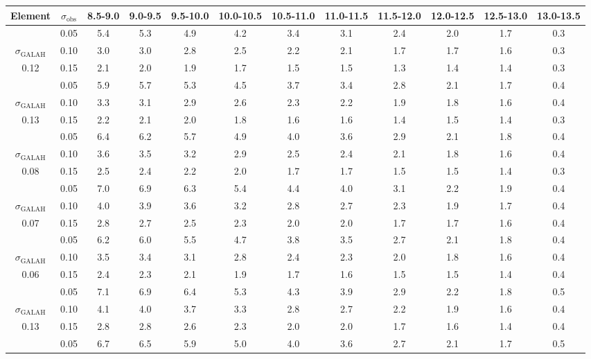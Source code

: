 \begin{tabular}{cccccccccccc}
\hline\hline
Element & $\sigma_\mathrm{obs}$  & 8.5-9.0 & 9.0-9.5 & 9.5-10.0 & 10.0-10.5 & 10.5-11.0 & 11.0-11.5 & 11.5-12.0 & 12.0-12.5 & 12.5-13.0 & 13.0-13.5 \\
\hline
[C/H] & 0.05 & 5.4 & 5.3 & 4.9 & 4.2 & 3.4 & 3.1 & 2.4 & 2.0 & 1.7 & 0.3 \\
$\sigma_\mathrm{GALAH}$ & 0.10 & 3.0 & 3.0 & 2.8 & 2.5 & 2.2 & 2.1 & 1.7 & 1.7 & 1.6 & 0.3 \\
0.12 & 0.15 & 2.1 & 2.0 & 1.9 & 1.7 & 1.5 & 1.5 & 1.3 & 1.4 & 1.4 & 0.3 \\
\hline
[O/H] & 0.05 & 5.9 & 5.7 & 5.3 & 4.5 & 3.7 & 3.4 & 2.8 & 2.1 & 1.7 & 0.4 \\
$\sigma_\mathrm{GALAH}$ & 0.10 & 3.3 & 3.1 & 2.9 & 2.6 & 2.3 & 2.2 & 1.9 & 1.8 & 1.6 & 0.4 \\
0.13 & 0.15 & 2.2 & 2.1 & 2.0 & 1.8 & 1.6 & 1.6 & 1.4 & 1.5 & 1.4 & 0.3 \\
\hline
[Mg/H] & 0.05 & 6.4 & 6.2 & 5.7 & 4.9 & 4.0 & 3.6 & 2.9 & 2.1 & 1.8 & 0.4 \\
$\sigma_\mathrm{GALAH}$ & 0.10 & 3.6 & 3.5 & 3.2 & 2.9 & 2.5 & 2.4 & 2.1 & 1.8 & 1.6 & 0.4 \\
0.08 & 0.15 & 2.5 & 2.4 & 2.2 & 2.0 & 1.7 & 1.7 & 1.5 & 1.5 & 1.4 & 0.3 \\
\hline
[Al/H] & 0.05 & 7.0 & 6.9 & 6.3 & 5.4 & 4.4 & 4.0 & 3.1 & 2.2 & 1.9 & 0.4 \\
$\sigma_\mathrm{GALAH}$ & 0.10 & 4.0 & 3.9 & 3.6 & 3.2 & 2.8 & 2.7 & 2.3 & 1.9 & 1.7 & 0.4 \\
0.07 & 0.15 & 2.8 & 2.7 & 2.5 & 2.3 & 2.0 & 2.0 & 1.7 & 1.7 & 1.6 & 0.4 \\
\hline
[Si/H] & 0.05 & 6.2 & 6.0 & 5.5 & 4.7 & 3.8 & 3.5 & 2.7 & 2.1 & 1.8 & 0.4 \\
$\sigma_\mathrm{GALAH}$ & 0.10 & 3.5 & 3.4 & 3.1 & 2.8 & 2.4 & 2.3 & 2.0 & 1.8 & 1.6 & 0.4 \\
0.06 & 0.15 & 2.4 & 2.3 & 2.1 & 1.9 & 1.7 & 1.6 & 1.5 & 1.5 & 1.4 & 0.4 \\
\hline
[V/H] & 0.05 & 7.1 & 6.9 & 6.4 & 5.3 & 4.3 & 3.9 & 2.9 & 2.2 & 1.8 & 0.5 \\
$\sigma_\mathrm{GALAH}$ & 0.10 & 4.1 & 4.0 & 3.7 & 3.3 & 2.8 & 2.7 & 2.2 & 1.9 & 1.6 & 0.4 \\
0.13 & 0.15 & 2.8 & 2.8 & 2.6 & 2.3 & 2.0 & 2.0 & 1.7 & 1.6 & 1.4 & 0.4 \\
\hline
[Cr/H] & 0.05 & 6.7 & 6.5 & 5.9 & 5.0 & 4.0 & 3.6 & 2.7 & 2.1 & 1.7 & 0.5 \\

\end{tabular}
